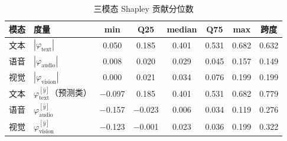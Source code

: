 \begin{table}[htbp]
  \centering\small
  \caption{三模态 Shapley 贡献分位数}
  \label{tab:p3-shapley-quantile}
  \begin{tabularx}{\textwidth}{@{}lXcccccc@{}}
    \toprule
    模态 & 度量 & min & Q25 & median & Q75 & max & 跨度 \\
    \midrule
    文本 & $|\varphi_{\text{text}}|$         & 0.050 & 0.185 & 0.401 & 0.531 & 0.682 & 0.632 \\
    语音 & $|\varphi_{\text{audio}}|$        & 0.008 & 0.020 & 0.029 & 0.045 & 0.157 & 0.149 \\
    视觉 & $|\varphi_{\text{vision}}|$       & 0.000 & 0.021 & 0.034 & 0.076 & 0.199 & 0.199 \\
    \midrule
    文本 & $\varphi_{\text{text}}^{[\hat y]}$（预测类）  & $-$0.097 & 0.185 & 0.401 & 0.531 & 0.682 & 0.779 \\
    语音 & $\varphi_{\text{audio}}^{[\hat y]}$           & $-$0.157 & $-$0.023 & 0.006 & 0.034 & 0.119 & 0.276 \\
    视觉 & $\varphi_{\text{vision}}^{[\hat y]}$          & $-$0.123 & $-$0.001 & 0.023 & 0.036 & 0.199 & 0.322 \\
    \bottomrule
  \end{tabularx}
  \par \smallskip
  \end{table}